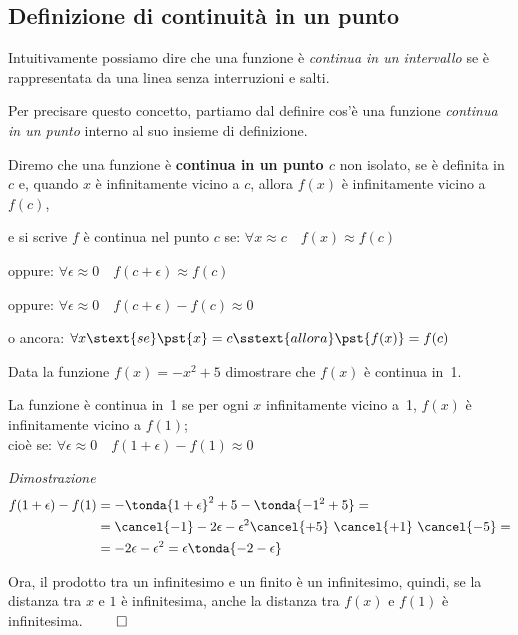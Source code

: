 \subsection{Definizione di continuità in un punto}
\label{subsec:cont_definizione}

Intuitivamente possiamo dire che una funzione è 
\emph{continua in un intervallo} 
se è rappresentata da una linea senza interruzioni e salti.

Per precisare questo concetto, partiamo dal definire cos'è una funzione 
\emph{continua in un punto} interno al suo insieme di definizione.

\begin{definizione}
Diremo che una funzione è \textbf{continua in un punto \(c\)} non isolato, 
se è definita in \(c\) e, 
quando \(x\) è infinitamente vicino a \(c\), 
allora \(f(x)\) è infinitamente vicino a \(f(c)\), 

\vspace{1em}
e si scrive \(f\) è continua nel punto \(c\) se: \hspace{5mm}
\(\forall x \approx c \quad f(x) \approx f(c)\)

\vspace{.5em}
oppure: \hspace{51mm}
\(\forall \epsilon \approx 0 \quad f(c + \epsilon) \approx f(c)\)

\vspace{.5em}
oppure: \hspace{51mm}
\(\forall \epsilon \approx 0 \quad f(c + \epsilon) - f(c) \approx 0\)

\vspace{.5em}
o ancora: \hspace{49mm}
\(\forall x \stext{se } \pst{x} = c \sstext{allora} \pst{f(x)} = f(c)\)
\end{definizione}

\begin{esempio}
Data la funzione \(f(x)=-x^2+5\) dimostrare che \(f(x)\) è continua in~1.

{
La funzione è continua in~1 se per ogni \(x\) infinitamente vicino a~1, 
\(f(x)\) è infinitamente vicino a \(f(1)\); \\
cioè se: \quad 
\(\forall \epsilon \approx 0 \quad f(1 + \epsilon) - f(1) \approx 0\)

\emph{Dimostrazione}
\begin{align*}
f(1+\epsilon) - f(1) &= 
-\tonda{1+\epsilon}^2+5-\tonda{-1^2+5}=\\
&=\cancel{-1}-2\epsilon-\epsilon^2 \cancel{+5}~
  \cancel{+1}~\cancel{-5} = \\
&=-2\epsilon-\epsilon^2 = 
\epsilon \tonda{-2 - \epsilon}
\end{align*}
}{
\scalebox{1}{\contprimo}
}
Ora, il prodotto tra un infinitesimo e un finito è un infinitesimo, quindi, 
se la distanza tra \(x\) e \(1\) è infinitesima, anche la distanza tra 
\(f(x)\) e \(f(1)\) è infinitesima. \hfill \(\qed\) 
 
\end{esempio}

